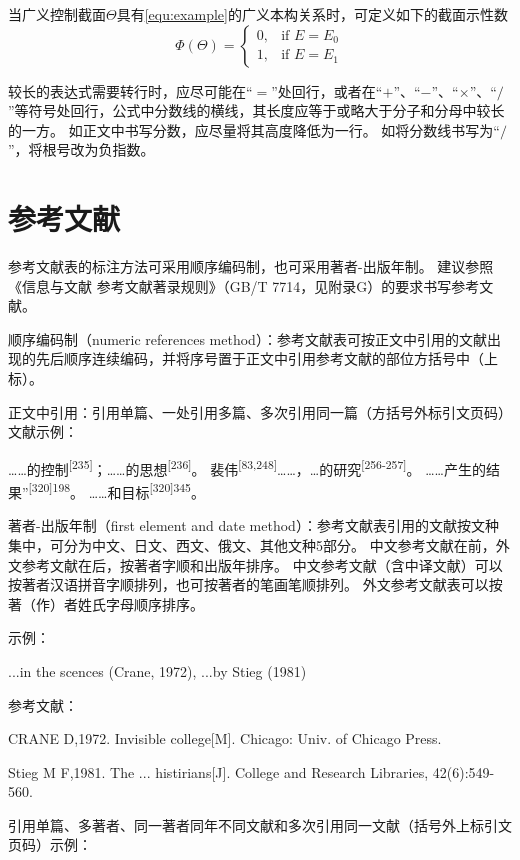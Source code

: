当广义控制截面$\Theta$具有\ref{equ:example}的广义本构关系时，可定义如下的截面示性数
\begin{equation}
    \Phi\left(\Theta\right) =
    \begin{cases}
        0, & \text{if } E = E_{0} \\
        1, & \text{if } E = E_{1}
    \end{cases}
    \label{equ:example}
\end{equation}

较长的表达式需要转行时，应尽可能在“$=$”处回行，或者在“$+$”、“$-$”、“$\times$”、“$/$”等符号处回行，公式中分数线的横线，其长度应等于或略大于分子和分母中较长的一方。
如正文中书写分数，应尽量将其高度降低为一行。
如将分数线书写为“$/$”，将根号改为负指数。

\section{参考文献}

参考文献表的标注方法可采用顺序编码制，也可采用著者-出版年制。
建议参照《信息与文献 参考文献著录规则》（GB/T 7714，见附录G）的要求书写参考文献。

顺序编码制（numeric references method）：参考文献表可按正文中引用的文献出现的先后顺序连续编码，并将序号置于正文中引用参考文献的部位方括号中（上标）。

正文中引用：引用单篇、一处引用多篇、多次引用同一篇（方括号外标引文页码）文献示例：

……的控制\textsuperscript{[235]}；……的思想\textsuperscript{[236]}。
裴伟\textsuperscript{[83,248]}……，…的研究\textsuperscript{[256-257]}。
……产生的结果”\textsuperscript{[320]198}。
……和目标\textsuperscript{[320]345}。

著者-出版年制（first element and date method）：参考文献表引用的文献按文种集中，可分为中文、日文、西文、俄文、其他文种5部分。
中文参考文献在前，外文参考文献在后，按著者字顺和出版年排序。
中文参考文献（含中译文献）可以按著者汉语拼音字顺排列，也可按著者的笔画笔顺排列。
外文参考文献表可以按著（作）者姓氏字母顺序排序。

示例：

...in the scences (Crane, 1972), ...by Stieg (1981)

参考文献：

CRANE D,1972. Invisible college[M]. Chicago: Univ. of Chicago Press.

Stieg M F,1981. The ... histirians[J]. College and Research Libraries, 42(6):549-560.

引用单篇、多著者、同一著者同年不同文献和多次引用同一文献（括号外上标引文页码）示例：

